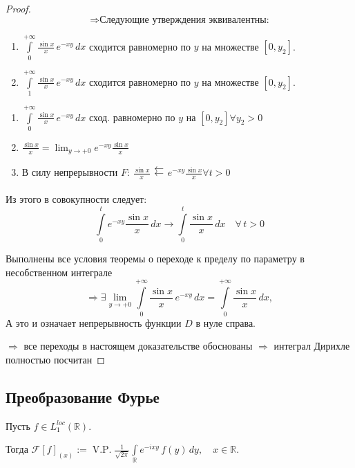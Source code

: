 \begin{proof}
\[
\Rightarrow \text{Следующие утверждения эквивалентны:}
\]

\begin{enumerate}
    \item \(\int\limits_0^{+\infty} \frac{\sin x}{x} \, e^{-x y} \, dx \) сходится равномерно по \( y \) на множестве \( [0, y_2] \).
    
    \item \(\int\limits_1^{+\infty} \frac{\sin x}{x} \, e^{-x y} \, dx \) сходится равномерно по \( y \) на множестве \( [0, y_2] \).
\end{enumerate}

\setlength{\parskip}{10pt}


\begin{enumerate}
    \item $\int\limits_0^{+\infty} \frac{\sin x}{x} \, e^{-x y} \, dx$ сход. равномерно по $y$ на $[0, y_2 ] \forall y_2>0$

    \item $\frac{\sin x}{x} = \lim_{y \to +0} e^{-x y} \frac{\sin x}{x}$


    \item В силу непрерывности $F$: $\frac{\sin x}{x} \mathrel{\substack{\leftleftarrows \\ [0, t]}} e^{-x y} \frac{\sin x}{x} \forall t >0$
    
\end{enumerate}

Из этого в совокупности следует:
\[
\int\limits_0^{t} e^{-x y} \frac{\sin x}{x} \, dx 
\longrightarrow 
\int\limits_0^{t} \frac{\sin x}{x} \, dx \quad \forall\, t > 0
\]


Выполнены все условия теоремы о переходе к пределу по параметру в несобственном интеграле %
\[
\Rightarrow \exists \lim_{y \to +0} \int\limits_0^{+\infty} \frac{\sin x}{x} \, e^{-x y} \, dx 
= \int\limits_0^{+\infty} \frac{\sin x}{x} \, dx,
\]
А это и означает непрерывность функции $D$ в нуле справа.


$\Rightarrow$ все переходы в настоящем доказательстве обоснованы $\Rightarrow$ интеграл Дирихле полностью посчитан

\end{proof}


\subsection{Преобразование Фурье}

\begin{definition}
Пусть $f \in L_1^{loc}(\mathbb{R}).$ 

\setlength{\parskip}{10pt}

Тогда $\mathcal{F}[f]_{(x)} := \operatorname{V.P.}\frac{1}{\sqrt{2\pi}} \int\limits_{\mathbb{R}} e^{-ixy} \, f(y) \, dy, \quad x \in \mathbb{R}.$
\end{definition}

